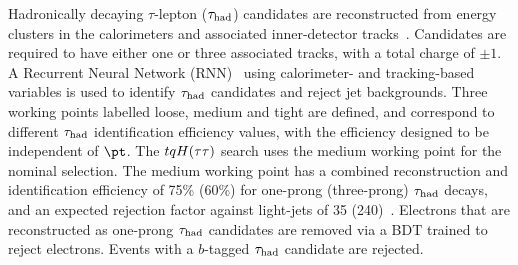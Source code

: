 Hadronically decaying $\tau$-lepton ($\tau_{\mathrm{had}}$) candidates are reconstructed from energy clusters in the calorimeters and
associated inner-detector tracks~\cite{ATL-PHYS-PUB-2019-033}. %
Candidates are required to have either one or three associated tracks,
with a total charge of $\pm 1$.
A Recurrent Neural Network (RNN)~\cite{Graves:2012SCI}
using calorimeter- and tracking-based variables is used to identify $\tau_{\mathrm{had}}$ candidates and reject jet backgrounds.
Three working points labelled loose, medium and tight are defined, and correspond to different $\tau_{\mathrm{had}}$ identification efficiency values, with the efficiency designed to be independent of $\pt$. The $tqH(\tau\tau)$ search uses the medium
working point for the nominal selection.
The medium working point has a combined reconstruction and identification efficiency of 75\% (60\%) for one-prong (three-prong) $\tau_{\mathrm{had}}$ 
decays, and an expected rejection factor against light-jets of 35 (240)~\cite{ATL-PHYS-PUB-2019-033}. 
Electrons that are reconstructed as one-prong $\tau_{\mathrm{had}}$ candidates are removed via a BDT trained to reject electrons.
Events with a $b$-tagged $\tau_{\mathrm{had}}$ candidate are rejected.
